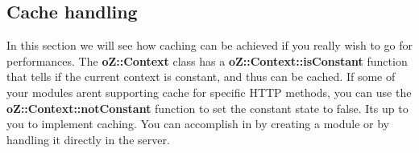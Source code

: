 \begin{DoxyCode}{0}
\DoxyCodeLine{\{}
\DoxyCodeLine{}
\DoxyCodeLine{\}}
\end{DoxyCode}


\subsection*{Cache handling}

In this section we will see how caching can be achieved if you really wish to go for performances. The {\bfseries{o\+Z\+::\+Context}} class has a {\bfseries{o\+Z\+::\+Context\+::is\+Constant}} function that tells if the current context is constant, and thus can be cached. If some of your modules aren\textquotesingle{}t supporting cache for specific H\+T\+TP methods, you can use the {\bfseries{o\+Z\+::\+Context\+::not\+Constant}} function to set the constant state to false. It\textquotesingle{}s up to you to implement caching. You can accomplish in by creating a module or by handling it directly in the server. 